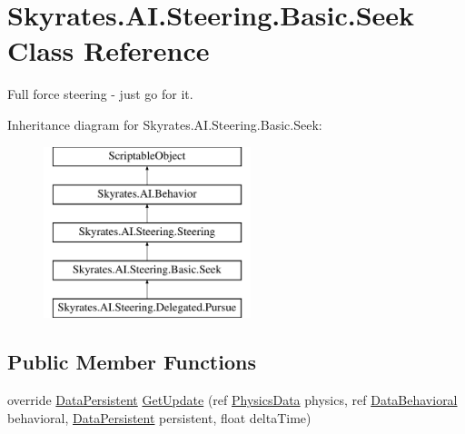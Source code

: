 \hypertarget{class_skyrates_1_1_a_i_1_1_steering_1_1_basic_1_1_seek}{\section{Skyrates.\-A\-I.\-Steering.\-Basic.\-Seek Class Reference}
\label{class_skyrates_1_1_a_i_1_1_steering_1_1_basic_1_1_seek}
}


Full force steering -\/ just go for it.  


Inheritance diagram for Skyrates.\-A\-I.\-Steering.\-Basic.\-Seek\-:\begin{figure}[H]
\begin{center}
\leavevmode
\includegraphics[height=5.000000cm]{class_skyrates_1_1_a_i_1_1_steering_1_1_basic_1_1_seek}
\end{center}
\end{figure}
\subsection*{Public Member Functions}
\begin{DoxyCompactItemize}
\item 
override \hyperlink{class_skyrates_1_1_a_i_1_1_behavior_1_1_data_persistent}{Data\-Persistent} \hyperlink{class_skyrates_1_1_a_i_1_1_steering_1_1_basic_1_1_seek_a71808935baa1eb950feca8c380b157e0}{Get\-Update} (ref \hyperlink{class_skyrates_1_1_physics_1_1_physics_data}{Physics\-Data} physics, ref \hyperlink{class_skyrates_1_1_a_i_1_1_behavior_1_1_data_behavioral}{Data\-Behavioral} behavioral, \hyperlink{class_skyrates_1_1_a_i_1_1_behavior_1_1_data_persistent}{Data\-Persistent} persistent, float delta\-Time)
\end{DoxyCompactItemize}
